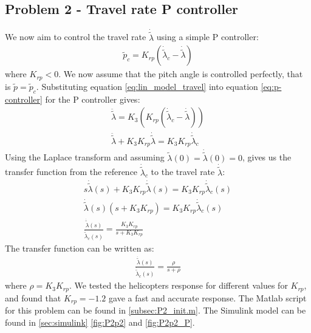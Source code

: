 \subsection{Problem 2 - Travel rate P controller}
We now aim to control the travel rate $\dot{\tilde{\lambda}}$ using a simple P controller:
\begin{gather*}
    \tilde{p}_c = K_{rp}(\dot{\tilde{\lambda}}_c - \dot{\tilde{\lambda}})
    \label{eq:p-controller}
\end{gather*}
where $K_{rp} < 0$. We now assume that the pitch angle is controlled perfectly, that is $\tilde{p} = \tilde{p}_c$. Substituting equation \eqref{eq:lin_model_travel} into equation \eqref{eq:p-controller} for the P controller gives:
\begin{gather*}
    \ddot{\tilde{\lambda}} = K_3(K_{rp}(\dot{\tilde{\lambda}}_c - \dot{\tilde{\lambda}})) \\ 
    \ddot{\tilde{\lambda}} + K_3K_{rp}\dot{\tilde{\lambda}} = K_3K_{rp}\dot{\tilde{\lambda}}_c
\end{gather*}
Using the Laplace transform and assuming  $\tilde{\lambda}(0) = \dot{\tilde{\lambda}}(0) = 0$, gives us the transfer function from the reference $\dot{\tilde{\lambda}}_c$ to the travel rate $\dot{\tilde{\lambda}}$:
\begin{gather*}
    s\dot{\tilde{\lambda}}(s) + K_3K_{rp}\dot{\tilde{\lambda}}(s) = K_3K_{rp}\dot{\tilde{\lambda}}_c(s) \\
    \dot{\tilde{\lambda}}(s)(s + K_3K_{rp}) = K_3K_{rp}\dot{\tilde{\lambda}}_c(s) \\
    \frac{\dot{\tilde{\lambda}}(s)}{\dot{\tilde{\lambda}}_c(s)} = \frac{K_3K_{rp}}{s + K_3K_{rp}}
\end{gather*}
The transfer function can be written as:
\begin{gather*}
    \frac{ \dot{\tilde{\lambda}}(s)}{\dot{\tilde{\lambda}}_c(s)} = \frac{\rho}{s + \rho}
\end{gather*}
where $\rho = K_3K_{rp}$. We tested the helicopters response for different values for $K_{rp}$, and found that $K_{rp} = -1.2$ gave a fast and accurate response. The Matlab script for this problem can be found in \cref{subsec:P2_init.m}. The Simulink model can be found in \cref{sec:simulink} \cref{fig:P2p2} and \cref{fig:P2p2_P}. 